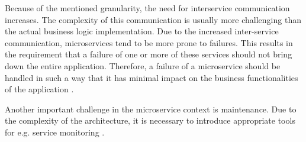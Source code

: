 Because of the mentioned granularity, the need for interservice communication increases. The complexity of this communication is usually more challenging than the actual business logic implementation. Due to the increased inter-service communication, microservices tend to be more prone to failures. This results in the requirement that a failure of one or more of these services should not bring down the entire application. Therefore, a failure of a microservice should be handled in such a way that it has minimal impact on the business functionalities of the application \cite[p. 11 ff.]{sm3}.

Another important challenge in the microservice context is maintenance. Due to the complexity of the architecture, it is necessary to introduce appropriate tools for e.g. service monitoring \cite[p. 16]{sm3}.